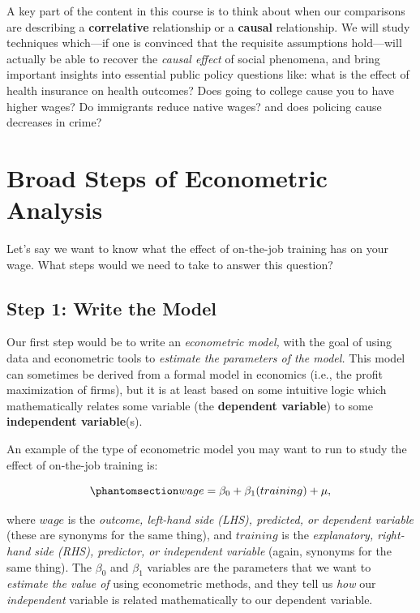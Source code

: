 \documentclass[
  letterpaper,
  DIV=11,
  numbers=noendperiod]{scrreprt}
\begin{document}
A key part of the content in this course is to think about when our
comparisons are describing a \textbf{correlative} relationship or a
\textbf{causal} relationship. We will study techniques which---if one is
convinced that the requisite assumptions hold---will actually be able to
recover the \emph{causal effect} of social phenomena, and bring
important insights into essential public policy questions like: what is
the effect of health insurance on health outcomes? Does going to college
cause you to have higher wages? Do immigrants reduce native wages? and
does policing cause decreases in crime?

\section{Broad Steps of Econometric
Analysis}\label{broad-steps-of-econometric-analysis}

Let's say we want to know what the effect of on-the-job training has on
your wage. What steps would we need to take to answer this question?

\subsection{Step 1: Write the Model}\label{step-1-write-the-model}

Our first step would be to write an \emph{econometric model,} with the
goal of using data and econometric tools to \emph{estimate the
parameters of the model.} This model can sometimes be derived from a
formal model in economics (i.e., the profit maximization of firms), but
it is at least based on some intuitive logic which mathematically
relates some variable (the \textbf{dependent variable}) to some
\textbf{independent variable}(s).

An example of the type of econometric model you may want to run to study
the effect of on-the-job training is:

\begin{equation}\protect\phantomsection\label{eq-basic-econometric-model}{
wage = \beta_0 + \beta_1(training) + \mu,
}\end{equation}

where \(wage\) is the \emph{outcome, left-hand side (LHS), predicted, or
dependent variable} (these are synonyms for the same thing), and
\(training\) is the \emph{explanatory, right-hand side (RHS), predictor,
or independent variable} (again, synonyms for the same thing). The
\(\beta_0\) and \(\beta_1\) variables are the parameters that we want to
\emph{estimate the value of} using econometric methods, and they tell us
\emph{how} our \emph{independent} variable is related mathematically to
our dependent variable.
\end{document}
